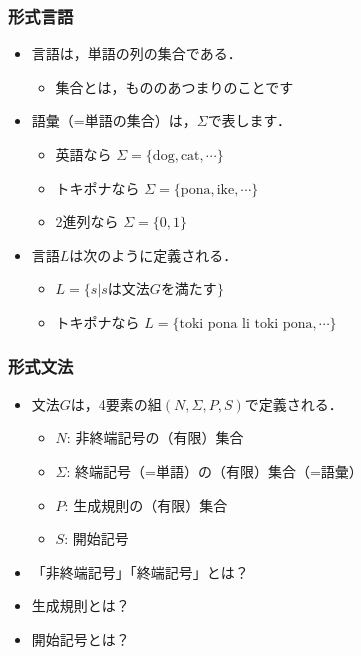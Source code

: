 \documentclass[14pt]{beamer}
\theoremstyle{definition}
\begin{document}
\begin{frame}
	\frametitle{形式言語}

	\begin{itemize}
		\item 言語は，単語の列の集合である．
			\begin{itemize}
				\item {\color{gray} \small 集合とは，もののあつまりのことです}
			\end{itemize}
		\item 語彙（=単語の集合）は，$\Sigma$で表します．
			\begin{itemize}
				\item 英語なら $\Sigma = \{\text{dog}, \text{cat}, \cdots\}$
				\item トキポナなら $\Sigma = \{\text{pona}, \text{ike}, \cdots\}$
				\item 2進列なら $\Sigma = \{0, 1\}$
			\end{itemize}
		\item 言語$L$は次のように定義される．
			\begin{itemize}
				\item $L = \{s | $$s\text{は文法}G\text{を満たす}\}$
				\item トキポナなら $L = \{\text{toki pona li toki pona}, \cdots\}$
			\end{itemize}
	\end{itemize}
\end{frame}


\begin{frame}
	\frametitle{形式文法}

	\begin{itemize}
		\item 文法$G$は，4要素の組$(N, \Sigma, P, S)$で定義される．
			\begin{itemize}
				\item $N$: 非終端記号の（有限）集合
				\item $\Sigma$: 終端記号（=単語）の（有限）集合（=語彙）
				\item $P$: 生成規則の（有限）集合
				\item $S$: 開始記号
			\end{itemize}
		\item 「非終端記号」「終端記号」とは？
		\item 生成規則とは？
		\item 開始記号とは？
	\end{itemize}
\end{frame}
\end{document}
